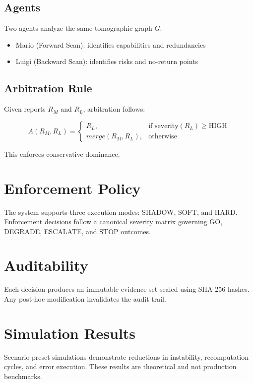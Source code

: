 \documentclass[11pt]{article}
\begin{document}
\subsection{Agents}

Two agents analyze the same tomographic graph $G$:

\begin{itemize}
\item Mario (Forward Scan): identifies capabilities and redundancies
\item Luigi (Backward Scan): identifies risks and no-return points
\end{itemize}

\subsection{Arbitration Rule}

Given reports $R_M$ and $R_L$, arbitration follows:

\[
A(R_M, R_L) =
\begin{cases}
R_L, & \text{if severity}(R_L) \ge \text{HIGH} \\
merge(R_M, R_L), & \text{otherwise}
\end{cases}
\]

This enforces conservative dominance.

\section{Enforcement Policy}

The system supports three execution modes: SHADOW, SOFT, and HARD. Enforcement decisions follow a canonical severity matrix governing GO, DEGRADE, ESCALATE, and STOP outcomes.

\section{Auditability}

Each decision produces an immutable evidence set sealed using SHA-256 hashes. Any post-hoc modification invalidates the audit trail.

\section{Simulation Results}

Scenario-preset simulations demonstrate reductions in instability, recomputation cycles, and error execution. These results are theoretical and not production benchmarks.
\end{document}
